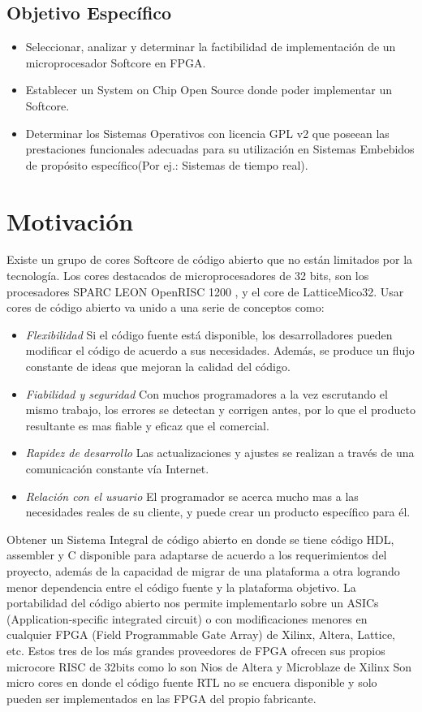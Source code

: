 \subsection{Objetivo Específico}
\begin{itemize}
\item Seleccionar, analizar y determinar la factibilidad de implementación de un microprocesador Softcore en FPGA.
\item Establecer un System on Chip Open Source donde poder implementar un Softcore.
\item Determinar los Sistemas Operativos con licencia GPL v2 que poseean las prestaciones funcionales adecuadas para su utilización en Sistemas
Embebidos de propósito específico(Por ej.: Sistemas de tiempo real).
\end{itemize}

\section{Motivación} 

Existe un grupo de cores Softcore de código abierto que no están limitados por la tecnología. Los cores destacados de microprocesadores de 32 bits,
son los procesadores SPARC LEON OpenRISC 1200 , y el core de LatticeMico32. Usar cores de código abierto va unido a una serie de conceptos como:
\begin {itemize}
\item
\textit{Flexibilidad}  Si el código fuente está disponible, los desarrolladores pueden modificar el código de acuerdo a sus necesidades. Además, se
produce un flujo constante de ideas que mejoran la calidad del código.
\item 
\textit{Fiabilidad y seguridad}  Con muchos programadores a la vez escrutando el mismo trabajo, los errores se detectan y corrigen antes, por lo que
el producto resultante es mas fiable y eficaz que el comercial.
\item 
\textit{Rapidez de desarrollo}  Las actualizaciones y ajustes se realizan a través de una comunicación constante vía Internet.
\item 
\textit{Relación con el usuario} El programador se acerca mucho mas a las necesidades reales de su cliente, y puede crear un producto específico para
él.
 \end {itemize}
 
Obtener un Sistema Integral de código abierto en donde se tiene código HDL, assembler y C disponible para adaptarse de acuerdo a los requerimientos
del proyecto, además de la capacidad de migrar de una plataforma a otra logrando menor dependencia entre el código fuente y la plataforma
objetivo. La portabilidad del código abierto nos permite implementarlo sobre un ASICs (Application-specific integrated circuit) o con modificaciones
menores en cualquier FPGA (Field Programmable Gate Array) de Xilinx, Altera, Lattice, etc. Estos tres de los más grandes proveedores de FPGA  %
ofrecen sus propios microcore RISC de 32bits como lo son Nios de  Altera y Microblaze de Xilinx  Son micro cores en donde el código fuente RTL no se
encuera disponible y solo pueden ser implementados en las FPGA del propio fabricante.

